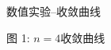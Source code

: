 \documentclass{beamer}
\begin{document}
\begin{frame}{数值实验--收敛曲线}
\begin{figure}[H]
\end{figure}
\begin{center}
	\small\textcolor[rgb]{0,0.25,0.604}{图 1: }$n=4$收敛曲线
\end{center}
\end{frame}
\end{document}

